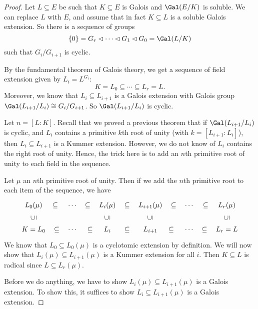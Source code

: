 \documentclass[a4paper]{article}
\begin{document}
\begin{proof}
  Let $L \subseteq E$ be such that $K \subseteq E$ is Galois and $\Gal(E/K)$ is soluble. We can replace $L$ with $E$, and assume that in fact $K\subseteq L$ is a soluble Galois extension. So there is a sequence of groups
  \[
    \{0\} = G_r \lhd \cdots \lhd G_1 \lhd G_0 = \Gal(L/K)
  \]
  such that $G_i/G_{i + 1}$ is cyclic.

  By the fundamental theorem of Galois theory, we get a sequence of field extension given by $L_i = L^{G_i}$:
  \[
    K = L_0 \subseteq \cdots \subseteq L_r = L.
  \]
  Moreover, we know that $L_i \subseteq L_{i + 1}$ is a Galois extension with Galois group $\Gal(L_{i + 1}/L_i) \cong G_i/G_{i + 1}$. So $\Gal(L_{i + 1}/L_i)$ is cyclic.

  Let $n = [L:K]$. Recall that we proved a previous theorem that if $\Gal(L_{i + 1}/L_i)$ is cyclic, and $L_i$ contains a primitive $k$th root of unity (with $k = [L_{i + 1}:L_i]$), then $L_i \subseteq L_{i + 1}$ is a Kummer extension. However, we do not know of $L_i$ contains the right root of unity. Hence, the trick here is to add an $n$th primitive root of unity to each field in the sequence.

  Let $\mu$ an $n$th primitive root of unity. Then if we add the $n$th primitive root to each item of the sequence, we have
  \[
    \begin{tikzcd}
      L_0(\mu) \ar[r, phantom, "{\subseteq}"] \ar [d, phantom, "\rotatebox{90}{$\subseteq$}"] & \cdots \ar [r, phantom, "{\subseteq}"] & L_i(\mu) \ar[r, phantom, "{\subseteq}"] \ar [d, phantom, "\rotatebox{90}{$\subseteq$}"]& L_{i + 1}(\mu) \ar[r, phantom, "{\subseteq}"] \ar [d, phantom, "\rotatebox{90}{$\subseteq$}"]& \cdots \ar [r, phantom, "{\subseteq}"] & L_r(\mu)\ar [d, phantom, "\rotatebox{90}{$\subseteq$}"]\\
      K = L_0 \ar[r, phantom, "{\subseteq}"] & \cdots \ar [r, phantom, "{\subseteq}"] & L_i \ar[r, phantom, "{\subseteq}"] & L_{i + 1} \ar[r, phantom, "{\subseteq}"] & \cdots \ar [r, phantom, "{\subseteq}"] & L_r = L
    \end{tikzcd}
  \]
  We know that $L_0\subseteq L_0(\mu)$ is a cyclotomic extension by definition. We will now show that $L_i(\mu) \subseteq L_{i + 1}(\mu)$ is a Kummer extension for all $i$. Then $K\subseteq L$ is radical since $L\subseteq L_r(\mu)$.

  Before we do anything, we have to show $L_i(\mu) \subseteq L_{i + 1}(\mu)$ is a Galois extension. To show this, it suffices to show $L_i \subseteq L_{i + 1}(\mu)$ is a Galois extension.


\end{proof}
\end{document}

